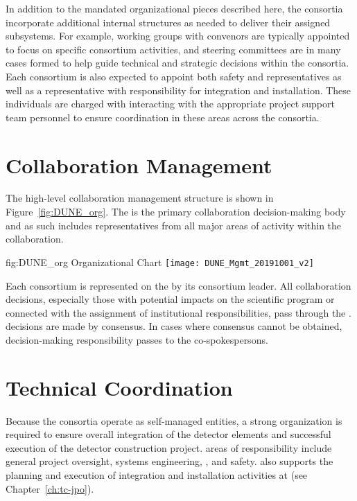 In addition to the mandated organizational pieces described here, 
the consortia incorporate additional internal structures as needed 
to deliver their assigned subsystems.  For example, working groups 
with convenors are typically appointed to focus on specific consortium 
activities, and steering committees are in many cases formed to help 
guide technical and strategic decisions within the consortia.  Each 
consortium is also expected to appoint both safety and  
representatives as well as a representative with responsibility for 
integration and installation.  These individuals are charged 
with interacting  with the appropriate project support team 
personnel to ensure coordination in these areas across the consortia.        

\section{ Collaboration Management}
\label{sec:dune_mgmt}

The high-level  collaboration management structure is 
shown in Figure~\ref{fig:DUNE_org}.  The   is 
the primary collaboration decision-making body and as such includes 
representatives from all major areas of activity within the 
collaboration.
\begin{dunefigure}{fig:DUNE_org}
  { Organizational Chart}
  \texttt{[image: DUNE\_Mgmt\_20191001\_v2]}
\end{dunefigure}

Each consortium is represented on the   by its 
consortium leader.  All collaboration decisions, especially those with 
potential impacts on the  scientific program or connected 
with the assignment of institutional responsibilities, pass through the 
.   decisions are made by  %
consensus.  In cases where consensus cannot be obtained, decision-making 
responsibility passes to the co-spokespersons.

\section{Technical Coordination}
\label{sec:tc}

Because the consortia operate as self-managed entities, a strong
 organization is required to ensure overall integration 
of the detector elements and successful execution of the detector
construction project.   areas of responsibility include 
general project oversight, systems engineering, , and 
safety.   also supports the planning and execution 
of integration and installation activities at  (see 
Chapter~\ref{ch:tc-jpo}).  

